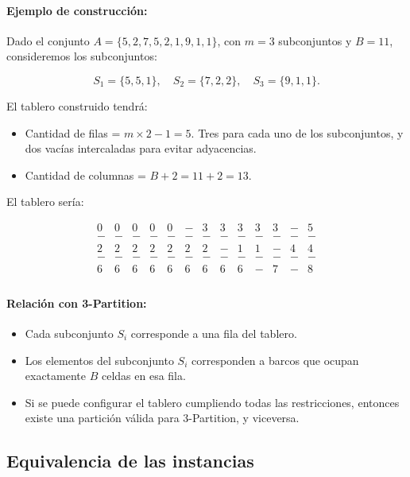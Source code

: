 
\paragraph{Ejemplo de construcción:}

Dado el conjunto \(A = \{5, 2, 7, 5, 2, 1, 9, 1, 1\}\), con \(m = 3\) subconjuntos y \(B = 11\), consideremos los subconjuntos:

\[
S_1 = \{5, 5, 1\}, \quad S_2 = \{7, 2, 2\}, \quad S_3 = \{9, 1, 1\}.
\]

El tablero construido tendrá:

\begin{itemize}
    \item Cantidad de filas = \(m \times 2 - 1 = 5\). Tres para cada uno de los subconjuntos, y dos vacías intercaladas para evitar adyacencias.
    \item Cantidad de columnas = \(B + 2 = 11 + 2 = 13\).
\end{itemize}

El tablero sería:

\[
\begin{array}{ccccccccccccc}
0 & 0 & 0 & 0 & 0 & - & 3 & 3 & 3 & 3 & 3 & - & 5 \\
- & - & - & - & - & - & - & - & - & - & - & - & - \\
2 & 2 & 2 & 2 & 2 & 2 & 2 & - & 1 & 1 & - & 4 & 4 \\
- & - & - & - & - & - & - & - & - & - & - & - & - \\
6 & 6 & 6 & 6 & 6 & 6 & 6 & 6 & 6 & - & 7 & - & 8 \\
\end{array}
\]

\paragraph{Relación con 3-Partition:}
\begin{itemize}
    \item Cada subconjunto \(S_i\) corresponde a una fila del tablero.
    \item Los elementos del subconjunto \(S_i\) corresponden a barcos que ocupan exactamente \(B\) celdas en esa fila.
    \item Si se puede configurar el tablero cumpliendo todas las restricciones, entonces existe una partición válida para \(3\)-Partition, y viceversa.
\end{itemize}

\subsection*{Equivalencia de las instancias}

